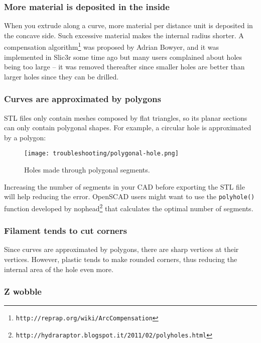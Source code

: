 \subsubsection{More material is deposited in the inside}

When you extrude along a curve, more material per distance unit is deposited in the concave side. Such excessive material makes the internal radius shorter. A compensation algorithm\footnote{\texttt{http://reprap.org/wiki/ArcCompensation}} was proposed by Adrian Bowyer, and it was implemented in Slic3r some time ago but many users complained about holes being too large – it was removed thereafter since smaller holes are better than larger holes since they can be drilled.

\subsubsection{Curves are approximated by polygons}

STL files only contain meshes composed by flat triangles, so its planar sections can only contain polygonal shapes. For example, a circular hole is approximated by a polygon:

\begin{figure}[H]
\centering
\texttt{[image: troubleshooting/polygonal-hole.png]}
\caption{Holes made through polygonal segments.}
\label{fig:polygonal-hole}
\end{figure}

Increasing the number of segments in your CAD before exporting the STL file will help reducing the error. OpenSCAD users might want to use the \texttt{polyhole()} function developed by nophead\footnote{\texttt{http://hydraraptor.blogspot.it/2011/02/polyholes.html}} that calculates the optimal number of segments.

\subsubsection{Filament tends to cut corners}

Since curves are approximated by polygons, there are sharp vertices at their vertices. However, plastic tends to make rounded corners, thus reducing the internal area of the hole even more.

\subsubsection{Z wobble}

